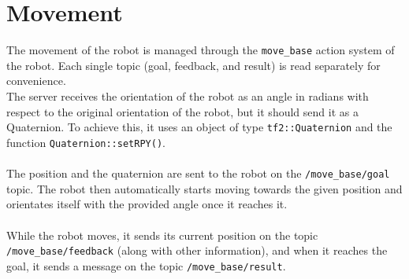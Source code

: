 \section{Movement}
The movement of the robot is managed through the \texttt{move\_base} action system of the robot. Each single topic (goal, feedback, and result) is read separately for convenience.\\
The server receives the orientation of the robot as an angle in radians with respect to the original orientation of the robot, but it should send it as a Quaternion. To achieve this, it uses an object of type \texttt{tf2::Quaternion} and the function \texttt{Quaternion::setRPY()}.\\\\
The position and the quaternion are sent to the robot on the \texttt{/move\_base/goal} topic. The robot then automatically starts moving towards the given position and orientates itself with the provided angle once it reaches it.\\\\
While the robot moves, it sends its current position on the topic \texttt{/move\_base/feedback} (along with other information), and when it reaches the goal, it sends a message on the topic \texttt{/move\_base/result}.\\